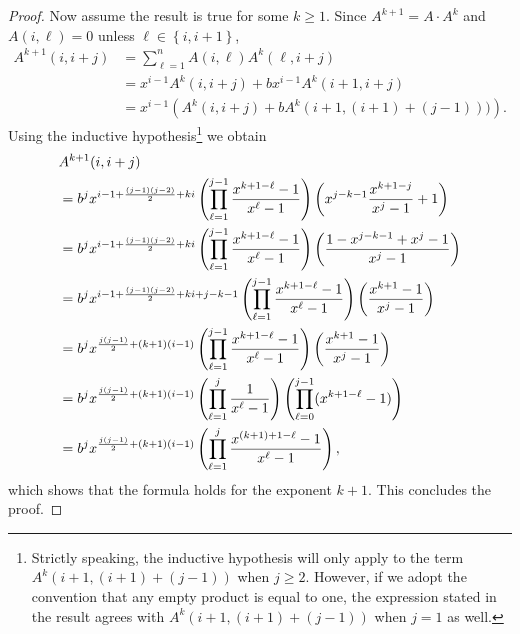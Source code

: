 \documentclass[9pt,lineno]{elife}
\begin{document}
\begin{appendixbox}
\begin{proof}
Now assume the result is true for some $k \ge 1$.  Since $A^{k+1} = A \cdot A^{k}$ and $A(i,\ell)=0$ unless $\ell \in \left\{ i , i+1 \right\}$,
\[
\begin{split}
A^{k+1}(i,i+j) &= \sum_{\ell=1}^n A(i,\ell) A^k(\ell, i+j) \\
  &= x^{i-1}A^k(i, i + j) + b x^{i-1}A^k(i+1,i+j) \\
  &= x^{i-1} \left( A^k(i,i+j) + bA^k(i+1,(i+1)+(j-1))) \right).
\end{split}
\]
Using the inductive hypothesis\footnote{Strictly speaking, the inductive hypothesis will only apply to the term $A^k(i+1,(i+1)+(j-1))$ when $j \ge 2$.  However, if we adopt the convention that any empty product is equal to one, the expression stated in the result agrees with $A^k(i+1,(i+1)+(j-1))$ when $j=1$ as well.} we obtain
\[
\begin{split}\hspace{-1.0cm}
& A^{k+1}(i, i+j)\\ 
& = b^j x^{i-1 + \frac{(j-1)(j-2)}{2}+ki} \left( \prod_{\ell=1}^{j-1} \frac{x^{k+1-\ell}-1}{x^{\ell}-1} \right) \left(x^{j-k-1}\frac{x^{k+1-j}}{x^j-1}+1  \right)\\
   &=b^j x^{i-1 + \frac{(j-1)(j-2)}{2}+ki} \left( \prod_{\ell=1}^{j-1} \frac{x^{k+1-\ell}-1}{x^{\ell}-1} \right) \left( \frac{1-x^{j-k-1}+x^j-1}{x^j-1}  \right)\\
   &=b^j x^{i-1 + \frac{(j-1)(j-2)}{2}+ki + j-k-1} \left( \prod_{\ell=1}^{j-1} \frac{x^{k+1-\ell}-1}{x^{\ell}-1} \right) \left( \frac{x^{k+1}-1}{x^j-1}  \right)\\
   &=b^j x^{\frac{j(j-1)}{2} + (k+1)(i-1)}  \left( \prod_{\ell=1}^{j-1} \frac{x^{k+1-\ell}-1}{x^{\ell}-1} \right) \left( \frac{x^{k+1}-1}{x^j-1}  \right) \\
   &=b^j x^{\frac{j(j-1)}{2} + (k+1)(i-1)}  \left( \prod_{\ell=1}^{j} \frac{1}{x^{\ell}-1} \right) \left(\prod_{\ell=0}^{j-1} (x^{k+1-\ell}-1)  \right) \\
   &= b^j x^{\frac{j(j-1)}{2} + (k+1)(i-1)}  \left( \prod_{\ell=1}^{j} \frac{x^{(k+1) + 1-\ell} -1}{x^{\ell}-1} \right), 
\end{split}
\]
\normalsize
which shows that the formula holds for the exponent $k+1$.  This concludes the proof.
\end{proof}



\end{appendixbox}
\end{document}
